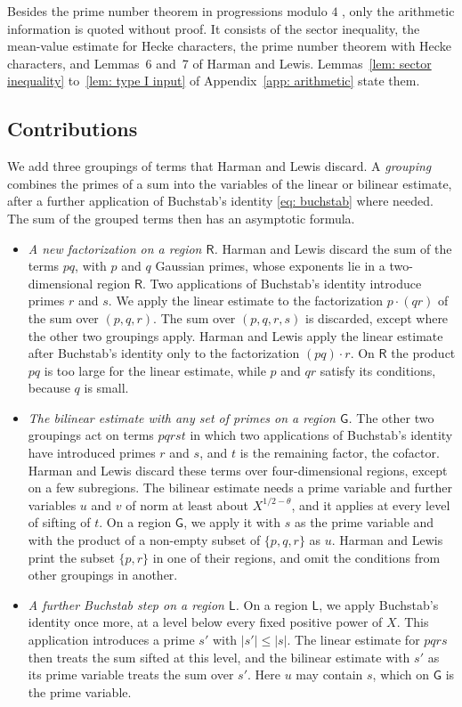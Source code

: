 \documentclass{article}
\numberwithin{equation}{section}
\newcommand{\Le}{\leqslant}
\begin{document}
Besides the prime number theorem in progressions modulo $4$ \citep[Section~1.2]{thorner2024refinements}, only the arithmetic information is quoted without proof. It consists of the sector inequality, the mean-value estimate for Hecke characters, the prime number theorem with Hecke characters, and Lemmas~6 and~7 of Harman and Lewis. Lemmas~\ref{lem: sector inequality} to~\ref{lem: type I input} of Appendix~\ref{app: arithmetic} state them.

\subsection{Contributions}
\label{subsec: contributions}

We add three groupings of terms that Harman and Lewis discard. A \emph{grouping} combines the primes of a sum into the variables of the linear or bilinear estimate, after a further application of Buchstab's identity \eqref{eq: buchstab} where needed. The sum of the grouped terms then has an asymptotic formula.
\begin{itemize}
\setlength{\itemsep}{0pt}
\item \emph{A new factorization on a region $\mathsf{R}$.} Harman and Lewis discard the sum of the terms $pq$, with $p$ and $q$ Gaussian primes, whose exponents lie in a two-dimensional region $\mathsf{R}$. Two applications of Buchstab's identity introduce primes $r$ and $s$. We apply the linear estimate to the factorization $p \cdot (qr)$ of the sum over $(p, q, r)$. The sum over $(p, q, r, s)$ is discarded, except where the other two groupings apply. Harman and Lewis apply the linear estimate after Buchstab's identity only to the factorization $(pq) \cdot r$. On $\mathsf{R}$ the product $pq$ is too large for the linear estimate, while $p$ and $qr$ satisfy its conditions, because $q$ is small.
\item \emph{The bilinear estimate with any set of primes on a region $\mathsf{G}$.} The other two groupings act on terms $pqrst$ in which two applications of Buchstab's identity have introduced primes $r$ and $s$, and $t$ is the remaining factor, the cofactor. Harman and Lewis discard these terms over four-dimensional regions, except on a few subregions. The bilinear estimate needs a prime variable and further variables $u$ and $v$ of norm at least about $X^{1/2 - \theta}$, and it applies at every level of sifting of $t$. On a region $\mathsf{G}$, we apply it with $s$ as the prime variable and with the product of a non-empty subset of $\{p, q, r\}$ as $u$. Harman and Lewis print the subset $\{p, r\}$ in one of their regions, and omit the conditions from other groupings in another.
\item \emph{A further Buchstab step on a region $\mathsf{L}$.} On a region $\mathsf{L}$, we apply Buchstab's identity once more, at a level below every fixed positive power of $X$. This application introduces a prime $s'$ with $|s'| \Le |s|$. The linear estimate for $pqrs$ then treats the sum sifted at this level, and the bilinear estimate with $s'$ as its prime variable treats the sum over $s'$. Here $u$ may contain $s$, which on $\mathsf{G}$ is the prime variable.
\end{itemize}
\end{document}
